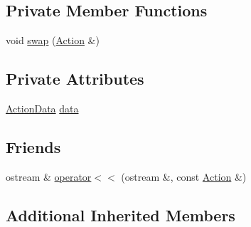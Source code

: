 \subsection*{Private Member Functions}
\begin{DoxyCompactItemize}
\item 
void \hyperlink{classghost_1_1Action_a8c965c1de8861fd2fd49cec707d94be0}{swap} (\hyperlink{classghost_1_1Action}{Action} \&)
\end{DoxyCompactItemize}
\subsection*{Private Attributes}
\begin{DoxyCompactItemize}
\item 
\hyperlink{structghost_1_1ActionData}{Action\-Data} \hyperlink{classghost_1_1Action_a3a86d913786cec4beb2900c7b46f9dfb}{data}
\end{DoxyCompactItemize}
\subsection*{Friends}
\begin{DoxyCompactItemize}
\item 
ostream \& \hyperlink{classghost_1_1Action_a44b75b6ed85320c12cd00afe16e9872d}{operator$<$$<$} (ostream \&, const \hyperlink{classghost_1_1Action}{Action} \&)
\end{DoxyCompactItemize}
\subsection*{Additional Inherited Members}


